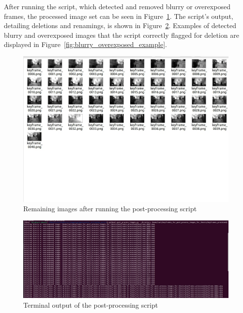 After running the script, which detected and removed blurry or overexposed frames, the processed image set can be seen in Figure~\ref{fig:keyframes_after_process}. The script’s output, detailing deletions and renamings, is shown in Figure~\ref{fig:image_process_script_output}. Examples of detected blurry and overexposed images that the script correctly flagged for deletion are displayed in Figure~\ref{fig:blurry_overexposed_example}.

\FloatBarrier
\begin{figure}[htbp]
	\centering
	\includegraphics[width=150mm, keepaspectratio]{figures_jpg/keyframes_after_process.jpg}
	\caption{Remaining images after running the post-processing script}
	\label{fig:keyframes_after_process}
\end{figure}

\begin{figure}[htbp]
	\centering
	\includegraphics[width=150mm, keepaspectratio]{figures_jpg/process_script_output.jpg}
	\caption{Terminal output of the post-processing script}
	\label{fig:image_process_script_output}
\end{figure}



